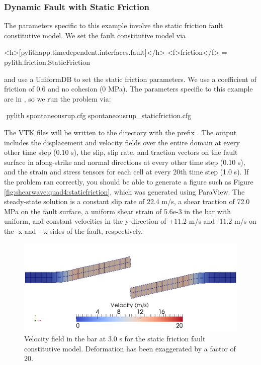 \subsubsection{Dynamic Fault with Static Friction}

The parameters specific to this example involve the static friction
fault constitutive model. We set the fault constitutive model via
\begin{cfg}
<h>[pylithapp.timedependent.interfaces.fault]</h>
<f>friction</f> = pylith.friction.StaticFriction
\end{cfg}
and use a UniformDB to set the static friction parameters. We use
a coefficient of friction of 0.6 and no cohesion (0 MPa). The parameters
specific to this example are in ,
so we run the problem via:
\begin{shell}
$$ pylith spontaneousrup.cfg spontaneousrup_staticfriction.cfg
\end{shell}
The VTK files will be written to the  directory with
the prefix . The output includes the displacement
and velocity fields over the entire domain at every other time step
(0.10 s), the slip, slip rate, and traction vectors on the fault surface
in along-strike and normal directions at every other time step (0.10
s), and the strain and stress tensors for each cell at every 20th
time step (1.0 s). If the problem ran correctly, you should be able
to generate a figure such as Figure \vref{fig:shearwave:quad4:staticfriction},
which was generated using ParaView. The steady-state solution is a
constant slip rate of 22.4 m/s, a shear traction of 72.0 MPa on the
fault surface, a uniform shear strain of 5.6e-3 in the bar with uniform,
and constant velocities in the y-direction of +11.2 m/s and -11.2
m/s on the -x and +x sides of the fault, respectively.

\begin{figure}
  \includegraphics[scale=0.5]{examples/figs/shearwave_quad4staticfriction30}
  \caption{Velocity field in the bar at 3.0 s for the static friction fault constitutive
    model. Deformation has been exaggerated by a factor of 20.}
  \label{fig:shearwave:quad4:staticfriction}
\end{figure}


